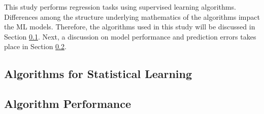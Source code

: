This study performs regression tasks using supervised learning algorithms.
Differences among the structure underlying mathematics of the algorithms impact the
\gls{ML} models.  Therefore, the algorithms used in this study will be discussed
in Section \ref{sec:algs}. Next, a discussion on model performance and prediction 
errors takes place in Section \ref{sec:errs}.

\subsection{Algorithms for Statistical Learning}
\label{sec:algs}


\subsection{Algorithm Performance}
\label{sec:errs}


